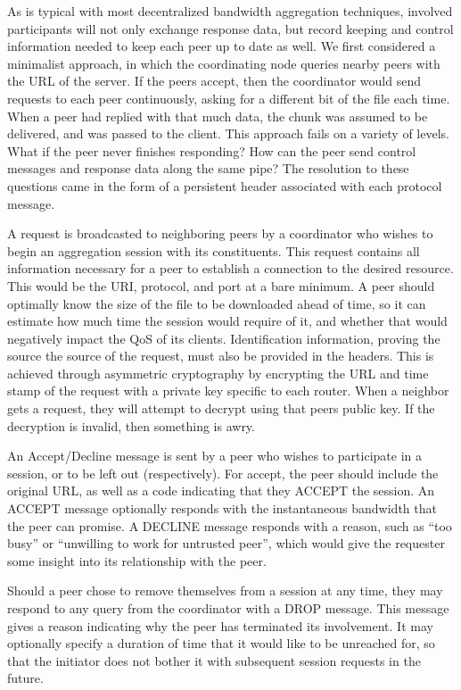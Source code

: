 \documentclass[12pt]{article}
\begin{document}
			As is typical with most decentralized bandwidth aggregation techniques, involved participants will not only exchange response data, but record keeping and control information needed to keep each peer up to date as well. We first considered a minimalist approach, in which the coordinating node queries nearby peers with the URL of the server. If the peers accept, then the coordinator would send requests to each peer continuously, asking for a different bit of the file each time. When a peer had replied with that much data, the chunk was assumed to be delivered, and was passed to the client. This approach fails on a variety of levels. What if the peer never finishes responding? How can the peer send control messages and response data along the same pipe? The resolution to these questions came in the form of a persistent header associated with each protocol message.

			A request is broadcasted to neighboring peers by a coordinator who wishes to begin an aggregation session with its constituents. This request contains all information necessary for a peer to establish a connection to the desired resource. This would be the URI, protocol, and port at a bare minimum. A peer should optimally know the size of the file to be downloaded ahead of time, so it can estimate how much time the session would require of it, and whether that would negatively impact the QoS of its clients. Identification information, proving the source the source of the request, must also be provided in the headers. This is achieved through asymmetric cryptography by encrypting the URL and time stamp of the request with a private key specific to each router. When a neighbor gets a request, they will attempt to decrypt using that peers public key. If the decryption is invalid, then something is awry.

			An Accept/Decline message is sent by a peer who wishes to participate in a session, or to be left out (respectively). For accept, the peer should include the original URL, as well as a code indicating that they ACCEPT the session. An ACCEPT message optionally responds with the instantaneous bandwidth that the peer can promise. A DECLINE message responds with a reason, such as ``too busy'' or ``unwilling to work for untrusted peer'', which would give the requester some insight into its relationship with the peer.

			Should a peer chose to remove themselves from a session at any time, they may respond to any query from the coordinator with a DROP message. This message gives a reason indicating why the peer has terminated its involvement. It may optionally specify a duration of time that it would like to be unreached for, so that the initiator does not bother it with subsequent session requests in the future.
			
\end{document}
